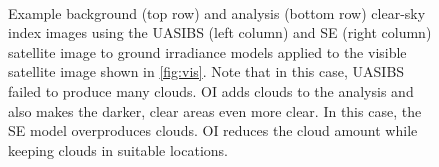 \begin{figure}[h]
\centering
\captionsetup[subfigure]{labelformat=empty}
\vspace{-1em}\\
\caption{Example background (top row) and analysis (bottom row)
  clear-sky index images using the UASIBS (left column) and SE (right
  column) satellite image to ground irradiance models applied to the
  visible satellite image shown in \cref{fig:vis}. Note that in this
  case, UASIBS failed to produce many clouds. OI adds clouds to the
  analysis and also makes the darker, clear areas even more clear.  In
  this case, the SE model overproduces clouds. OI reduces the cloud
  amount while keeping clouds in suitable locations.}
\label{fig:oi_example}
\end{figure}

